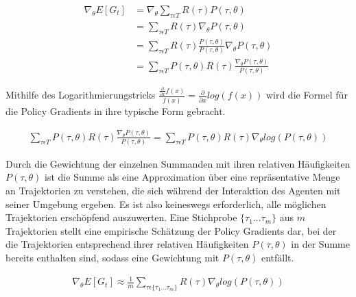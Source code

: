 \begin{equation}
\begin{aligned}
\nabla_\theta E[G_t]
&= \nabla_\theta \sum_{\tau \epsilon T} R(\tau) P(\tau, \theta)\\
&= \sum_{\tau \epsilon T} R(\tau) \nabla_\theta P(\tau, \theta)\\
&= \sum_{\tau \epsilon T} R(\tau) \frac{P(\tau, \theta)}{P(\tau, \theta)}
    \nabla_\theta P(\tau, \theta)\\
&= \sum_{\tau \epsilon T} P(\tau, \theta) R(\tau) \frac{\nabla_\theta P(\tau, \theta)}{P(\tau, \theta)}
\end{aligned}
\end{equation}

Mithilfe des Logarithmierungstricks $\frac{\frac{\partial}{\partial x} f(x)}{f(x)}
= \frac{\partial}{\partial x} log(f(x))$ wird die Formel für die Policy Gradients
in ihre typische Form gebracht.

\begin{equation}
\begin{aligned}
\sum_{\tau \epsilon T} P(\tau, \theta) R(\tau) \frac{\nabla_\theta P(\tau, \theta)}{P(\tau, \theta)}
= \sum_{\tau \epsilon T} P(\tau, \theta) R(\tau) \nabla_\theta log(P(\tau, \theta))
\end{aligned}
\end{equation}

Durch die Gewichtung der einzelnen Summanden mit ihren relativen Häufigkeiten
$P(\tau, \theta)$ ist die Summe als eine Approximation über eine repräsentative Menge
an Trajektorien zu verstehen, die sich während der Interaktion des Agenten mit seiner
Umgebung ergeben. Es ist also keineswegs erforderlich, alle möglichen Trajektorien
erschöpfend auszuwerten. Eine Stichprobe $\{ \tau_1 ... \tau_m \}$ aus $m$ Trajektorien
stellt eine empirische Schätzung der Policy Gradients dar, bei der die Trajektorien
entsprechend ihrer relativen Häufigkeiten $P(\tau, \theta)$ in der Summe bereits enthalten
sind, sodass eine Gewichtung mit $P(\tau, \theta)$ entfällt.

\begin{equation}
\begin{aligned}
\nabla_\theta E[G_t] \approx \frac{1}{m} \sum_{\tau \epsilon \{ \tau_1 ... \tau_m \}}
    R(\tau) \nabla_\theta log(P(\tau, \theta))
\end{aligned}
\end{equation}

